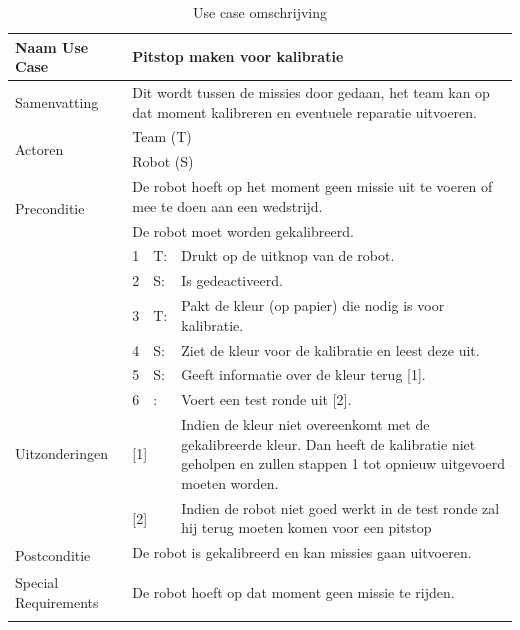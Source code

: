 \documentclass[12pt]{article} %
\begin{document}
\begin{table}[htbp]
  \centering
  \caption{Use case omschrijving}
    \begin{tabular}{llll}
    \toprule
    Naam Use Case & \multicolumn{3}{l}{\textbf{Pitstop maken voor kalibratie}} \\
    \midrule
    Samenvatting & \multicolumn{3}{l}{Dit wordt tussen de missies door gedaan, het team kan op dat moment kalibreren en eventuele reparatie uitvoeren.} \\
    \multirow{2}[1]{*}{Actoren} & \multicolumn{3}{l}{Team (T)} \\
          & \multicolumn{3}{l}{Robot (S)} \\
    \multirow{2}[1]{*}{Preconditie} & \multicolumn{3}{l}{De robot hoeft op het moment geen missie uit te voeren of mee te doen aan een wedstrijd.} \\
          & \multicolumn{3}{l}{De robot moet worden gekalibreerd.} \\
    \multirow{6}[11]{*}{} & 1     & T:    & Drukt op de uitknop van de robot.  \\
          & 2     & S:    & Is gedeactiveerd. \\
          & 3     & T:    & Pakt de kleur (op papier) die nodig is voor kalibratie. \\
          & 4     & S:    & Ziet de kleur voor de kalibratie en leest deze uit. \\
          & 5     & S:    & Geeft informatie over de kleur terug [1]. \\
          & 6     & :     & Voert een test ronde uit [2]. \\
    Uitzonderingen & \multicolumn{2}{l}{[1]} & Indien de kleur niet overeenkomt met de gekalibreerde kleur. Dan heeft de kalibratie niet geholpen en zullen stappen 1 tot opnieuw uitgevoerd moeten worden. \\
          & \multicolumn{2}{l}{[2]} & Indien de robot niet goed werkt in de test ronde zal hij terug moeten komen voor een pitstop \\
    \multirow{2}[1]{*}{Postconditie} & \multicolumn{3}{l}{De robot is gekalibreerd en kan missies gaan uitvoeren.} \\
          & \multicolumn{3}{l}{} \\
    Special Requirements  & \multicolumn{3}{l}{De robot hoeft op dat moment geen missie te rijden.} \\
          &       &       &  \\
    \bottomrule
    \end{tabular}%
  \label{tab:addlabel}%
\end{table}%
\clearpage
\newpage
\end{document}
